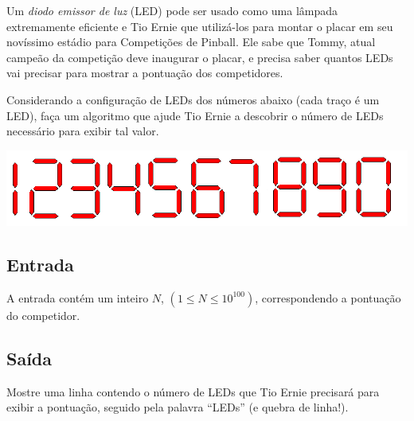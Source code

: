 
%
%
%

Um \emph{diodo emissor de luz} (LED) pode ser usado como uma lâmpada extremamente
eficiente e Tio Ernie que utilizá-los para montar o placar em seu novíssimo estádio
para Competições de Pinball. Ele sabe que Tommy, atual campeão da competição deve
inaugurar o placar, e precisa saber quantos LEDs vai precisar para mostrar a
pontuação dos competidores.

Considerando a configuração de LEDs dos números abaixo (cada traço é um LED),
faça um algoritmo que ajude Tio Ernie a descobrir o número de LEDs necessário
para exibir tal valor.

\begin{center}
\includegraphics[width=.8\textwidth]{leds}%
\end{center}%

\subsection*{Entrada}%
A entrada contém um inteiro $N$, $(1 \leq N \leq 10^{100})$, correspondendo a
pontuação do competidor.

\subsection*{Saída}%
Mostre uma linha contendo o número de LEDs que Tio Ernie precisará para exibir a
pontuação, seguido pela palavra ``LEDs'' (e quebra de linha!).

%